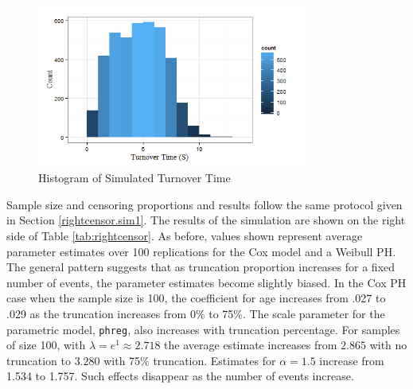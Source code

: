 \documentclass[12pt,letterpaper]{article}
\begin{document}
\begin{figure}[h!]
	\centering
    \includegraphics[width=3.5in]{truncationhist.png}
	\caption{Histogram of Simulated Turnover Time}
 	\label{fig:trunchist}
 \end{figure}

Sample size and censoring proportions and results follow the same protocol given in Section \ref{rightcensor.sim1}.  The results of the simulation are shown on the right side of Table \ref{tab:rightcensor}.  As before, values shown represent average parameter estimates over 100 replications for the Cox model and a Weibull PH.  The general pattern suggests that as truncation proportion increases for a fixed number of events, the parameter estimates become slightly biased.  In the Cox PH case when the sample size is 100, the coefficient for age increases from .027 to .029 as the truncation increases from 0\% to 75\%.  The scale parameter for the parametric model, {\tt phreg}, also increases with truncation percentage.  For samples of size 100, with $\lambda = e^1 \approx 2.718$ the average estimate increases from $2.865$ with no truncation to $3.280$ with 75\% truncation.  Estimates for $\alpha = 1.5$ increase from 1.534 to 1.757. Such effects disappear as the number of events increase.
\end{document}
